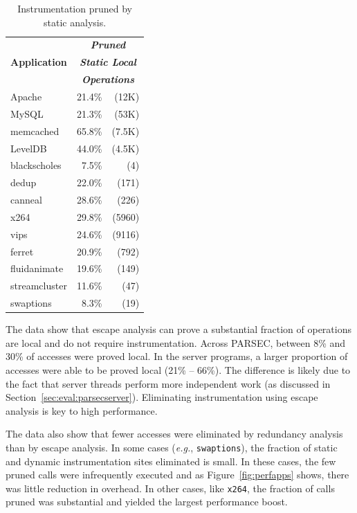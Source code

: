 \documentclass[preprint,9pt]{sigplanconf}
\begin{document}
\begin{table}
\centering
\small
\begin{tabular}{l | r r }
\multirow{3}{*}{\bf Application} & \multicolumn{2}{c}{\bf \em Pruned } \\
               & \multicolumn{2}{c}{\bf \em Static Local}  \\ 
               & \multicolumn{2}{c}{\bf \em Operations}    \\ \hline


Apache         &  21.4\%&(12K)                    \\
MySQL          &  21.3\%&(53K)                    \\
memcached      &  65.8\%&(7.5K)                   \\
LevelDB        &  44.0\%&(4.5K)                   \\ \hline
blackscholes   &   7.5\%&(4)                      \\
dedup          &   22.0\%&(171)                   \\
canneal        &   28.6\%&(226)                   \\
x264           &   29.8\%&(5960)                  \\
vips           &   24.6\%&(9116)                  \\
ferret         &   20.9\%&(792)                   \\
fluidanimate   &   19.6\%&(149)                   \\
streamcluster  &   11.6\%&(47)                    \\
swaptions      &   8.3\% &(19)                    \\
\end{tabular}
\caption{\label{tab:char}Instrumentation pruned by static analysis.}
\end{table}

The data show that escape analysis can prove a substantial fraction of
operations are local and do not require instrumentation.  Across PARSEC,
between 8\% and 30\% of accesses were proved local.  In the server programs, a
larger proportion of accesses were able to be proved local (21\% -- 66\%).  The
difference is likely due to the fact that server threads perform more
independent work (as discussed in Section~\ref{sec:eval:parsecserver}).  Eliminating
instrumentation using escape analysis is key to high performance.  

The data also show that fewer accesses were eliminated by redundancy analysis
than by escape analysis.  In some cases ({\em e.g.}, {\tt swaptions}), the
fraction of static and dynamic instrumentation sites eliminated is small.  In
these cases, the few pruned calls were infrequently executed and as
Figure~\ref{fig:perfapps} shows, there was little reduction in overhead.  In
other cases, like {\tt x264}, the fraction of calls pruned was substantial 
and yielded the largest performance boost.
\end{document}
